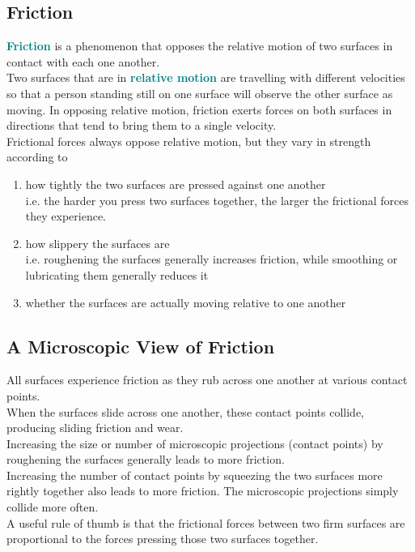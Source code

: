 \documentclass[12pt]{article}
\theoremstyle{definition}
\newcommand{\defnterm}[1]{\textbf{\textcolor{teal}{#1}}\index{#1}}
\begin{document}
\subsection{Friction}
\defnterm{Friction} is a phenomenon that opposes the relative motion of two surfaces in contact with each one another. \\
Two surfaces that are in \defnterm{relative motion} are travelling with different velocities so that a person standing still on one surface will observe the other surface as moving.
In opposing relative motion, friction exerts forces on both surfaces in directions that tend to bring them to a single velocity. \\

Frictional forces always oppose relative motion, but they vary in strength according to
\begin{enumerate}
  \item how tightly the two surfaces are pressed against one another \\
  i.e. the harder you press two surfaces together, the larger the frictional forces they experience.
  \item how slippery the surfaces are \\
  i.e. roughening the surfaces generally increases friction, while smoothing or lubricating them generally reduces it
  \item whether the surfaces are actually moving relative to one another
\end{enumerate}

\subsection{A Microscopic View of Friction}
All surfaces experience friction as they rub across one another at various contact points. \\
When the surfaces slide across one another, these contact points collide, producing sliding friction and wear. \\

Increasing the size or number of microscopic projections (contact points) by roughening the surfaces generally leads to more friction. \\
Increasing the number of contact points by squeezing the two surfaces more rightly together also leads to more friction.
The microscopic projections simply collide more often. \\

A useful rule of thumb is that the frictional forces between two firm surfaces are proportional to the forces pressing those two surfaces together. \\
\end{document}
